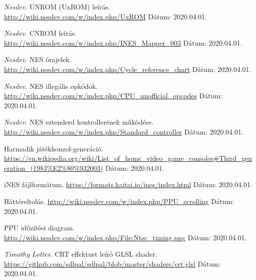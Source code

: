 \documentclass[
]{elteikthesis}[2020/02/26]
\begin{document}
\begin{thebibliography}{9}
	\textit{Nesdev.}
	UNROM (UxROM) leírás.
	\newline
	\url{http://wiki.nesdev.com/w/index.php/UxROM}
	\newline Dátum: 2020.04.01.
	
	\textit{Nesdev.}
	CNROM leírás.
	\newline
	\url{http://wiki.nesdev.com/w/index.php/INES_Mapper_003}
	\newline Dátum: 2020.04.01.
	
	\textit{Nesdev.}
	NES órajelek.
	\newline
	\url{http://wiki.nesdev.com/w/index.php/Cycle_reference_chart}
	\newline Dátum: 2020.04.01.
	
	\textit{Nesdev.}
	NES illegális opkódok.
	\newline
	\url{http://wiki.nesdev.com/w/index.php/CPU_unofficial_opcodes}
	\newline Dátum: 2020.04.01.
	
	\textit{Nesdev.}
	NES sztenderd kontrollerének működése.
	\newline
	\url{http://wiki.nesdev.com/w/index.php/Standard_controller}
	\newline Dátum: 2020.04.01.
	
	Harmadik játékkonzol-generáció.
	\newline
	\url{https://en.wikipedia.org/wiki/List_of_home_video_game_consoles#Third_generation_(1983\%E2\%80\%932003)}
	\newline Dátum: 2020.04.01.
	
	iNES fájlformátum.
	\newline
	\url{https://formats.kaitai.io/ines/index.html}
	\newline Dátum: 2020.04.01.
	
	Háttéreltolás.
	\newline
	\url{http://wiki.nesdev.com/w/index.php/PPU_scrolling}
	\newline Dátum: 2020.04.01.
	
	PPU időzítési diagram.
	\newline
	\url{http://wiki.nesdev.com/w/index.php/File:Ntsc_timing.png}
	\newline Dátum: 2020.04.01.
	
	\textit{Timothy Lottes.}
	CRT effektust leíró GLSL shader.
	\newline
	\url{https://github.com/sdlpal/sdlpal/blob/master/shaders/crt.glsl}
	\newline Dátum: 2020.04.01.
\end{thebibliography}
\cleardoublepage
\end{document}
